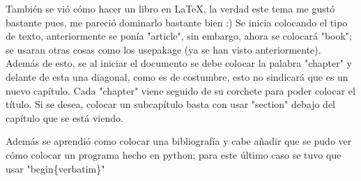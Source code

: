 \documentclass{book}
\begin{document}
	También se vió cómo hacer un libro en LaTeX, la verdad este tema me gustó bastante pues, me pareció dominarlo bastante bien :)
	Se inicia colocando el tipo de texto, anteriormente se ponía "article", sin embargo, ahora se colocará "book"; se usaran otras cosas como los usepakage (ya se han visto anteriormente).
	Además de esto, se al iniciar el documento se debe colocar la palabra "chapter" y delante de esta una diagonal, como es de costumbre, esto no sindicará que es un nuevo capítulo.
	Cada "chapter" viene seguido de su corchete para poder colocar el título.
	Si se desea, colocar un subcapítulo basta con usar "section" debajo del capítulo que se está viendo.
	
	Además se aprendió como colocar una bibliografía y cabe añadir que se pudo ver cómo colocar un programa hecho en python; para este último caso se tuvo que usar "begin\{verbatim\}" 
	
	
\end{document}
